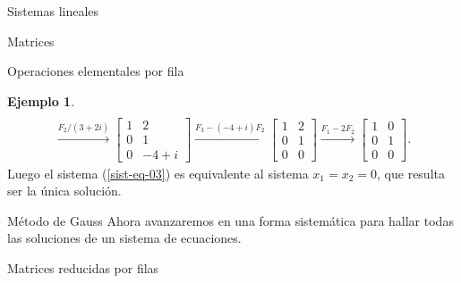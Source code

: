 \documentclass[a4paper,12pt,twoside,spanish,reqno]{amsbook}
\theoremstyle{definition}
\newtheorem{ejemplo}{Ejemplo}[section]
\theoremstyle{remark}
\begin{document}
\begin{chapter}{Sistemas lineales}
\begin{section}{Matrices}
\begin{subsection}{Operaciones elementales por fila}
\begin{ejemplo}
\begin{multline*}
                    \\
                    \stackrel{F_2/(3+2i)}{\longrightarrow} 
                    \begin{bmatrix} 1&2 \\ 0&1 \\ 0&-4+i \end{bmatrix}
                    \stackrel{F_3-(-4+i)F_2}{\longrightarrow} 
                    \begin{bmatrix} 1&2 \\ 0&1 \\ 0&0 \end{bmatrix}
                    \stackrel{F_1-2F_2}{\longrightarrow} 
                    \begin{bmatrix} 1&0 \\ 0&1 \\ 0&0 \end{bmatrix}.
                    \end{multline*}
                    Luego  el sistema (\ref{sist-eq-03}) es equivalente al sistema  $x_1=x_2 = 0$, que resulta ser la única solución.
                \end{ejemplo}
            \end{subsection} 
        


        
        \end{section}
    
    
    
            \begin{section}{Método de Gauss } Ahora avanzaremos en una forma sistemática para hallar todas las soluciones de un sistema de ecuaciones.
    
            
            \begin{subsection}{Matrices reducidas por filas} 
                

\end{subsection}
\end{section}
\end{chapter}
\end{document}
